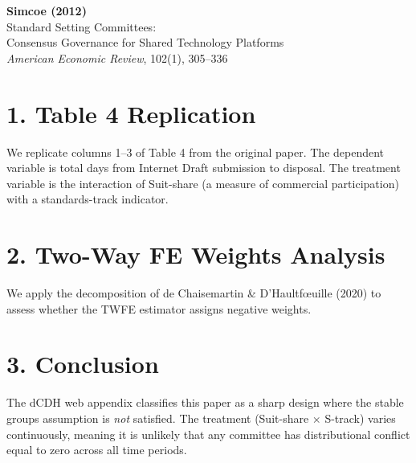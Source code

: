 \documentclass[12pt]{article}
\begin{document}
\begin{center}
{\Large\bfseries Simcoe (2012)}\\
{\large Standard Setting Committees:}\\
{\large Consensus Governance for Shared Technology Platforms}\\
\vspace{0.5em}
{\normalsize \textit{American Economic Review}, 102(1), 305--336}
\end{center}

\vspace{1em}

\section*{1. Table 4 Replication}

We replicate columns 1--3 of Table 4 from the original paper.
The dependent variable is total days from Internet Draft submission to disposal.
The treatment variable is the interaction of Suit-share
(a measure of commercial participation) with a standards-track indicator.



\clearpage

\section*{2. Two-Way FE Weights Analysis}

We apply the decomposition of de Chaisemartin \& D'Haultf\oe uille (2020)
to assess whether the TWFE estimator assigns negative weights.



\section*{3. Conclusion}

The dCDH web appendix classifies this paper as a sharp design
where the stable groups assumption is \textit{not} satisfied.
The treatment (Suit-share $\times$ S-track) varies continuously,
meaning it is unlikely that any committee has distributional conflict
equal to zero across all time periods.
\end{document}
